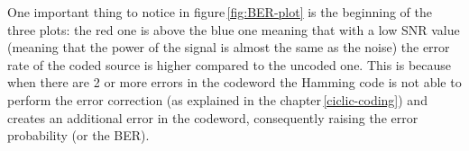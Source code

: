 One important thing to notice in figure\,\ref{fig:BER-plot} is the beginning of the three plots: the red one is above the blue one meaning that with a low SNR value (meaning that the power of the signal is almost the same as the noise) the error rate of the coded source is higher compared to the uncoded one. This is because when there are 2 or more errors in the codeword the Hamming code is not able to perform the error correction (as explained in the chapter\,\ref{ciclic-coding}) and creates an additional error in the codeword, consequently raising the error probability (or the BER).